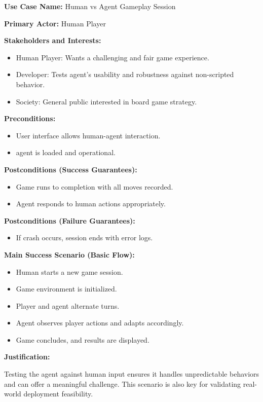 \documentclass{article}
\begin{document}
\noindent\textbf{Use Case Name:} Human vs \RL{} Agent Gameplay Session

\noindent\textbf{Primary Actor:} Human Player

\noindent\textbf{Stakeholders and Interests:}
\begin{itemize}
    \item Human Player: Wants a challenging and fair game experience.
    \item Developer: Tests agent's usability and robustness against non-scripted behavior.
    \item Society: General public interested in board game strategy.
\end{itemize}

\noindent\textbf{Preconditions:}
\begin{itemize}
    \item User interface allows human-agent interaction.
    \item \RL{} agent is loaded and operational.
\end{itemize}

\noindent\textbf{Postconditions (Success Guarantees):}
\begin{itemize}
    \item Game runs to completion with all moves recorded.
    \item Agent responds to human actions appropriately.
\end{itemize}

\noindent\textbf{Postconditions (Failure Guarantees):}
\begin{itemize}
    \item If crash occurs, session ends with error logs.
\end{itemize}

\noindent\textbf{Main Success Scenario (Basic Flow):}
\begin{itemize}
    \item Human starts a new game session.
    \item Game environment is initialized.
    \item Player and \RL{} agent alternate turns.
    \item Agent observes player actions and adapts accordingly.
    \item Game concludes, and results are displayed.
\end{itemize}

\noindent\textbf{Justification:}

Testing the agent against human input ensures it handles unpredictable behaviors and can offer a meaningful challenge. This scenario is also key for validating real-world deployment feasibility.
\end{document}
